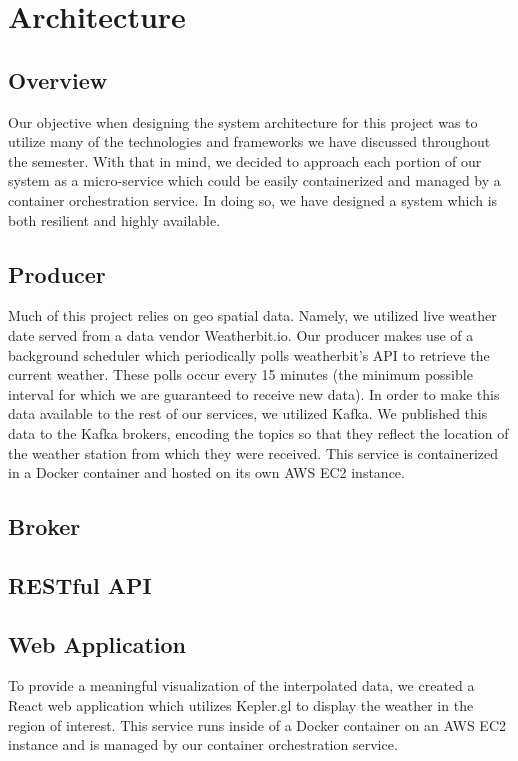 \section{Architecture}
\subsection{Overview}
Our objective when designing the system architecture for this project was to utilize many of the technologies and frameworks we have discussed throughout the semester.
With that in mind, we decided to approach each portion of our system as a micro-service which could be easily containerized and managed by a container orchestration service.
In doing so, we have designed a system which is both resilient and highly available. 

\subsection{Producer}
Much of this project relies on geo spatial data.
Namely, we utilized live weather date served from a data vendor Weatherbit.io.
Our producer makes use of a background scheduler which periodically polls weatherbit's API to retrieve the current weather.
These polls occur every 15 minutes (the minimum possible interval for which we are guaranteed to receive new data).
In order to make this data available to the rest of our services, we utilized Kafka.
We published this data to the Kafka brokers, encoding the topics so that they reflect the location of the weather station from which they were received.
This service is containerized in a Docker container and hosted on its own AWS EC2 instance.

\subsection{Broker}
\cite{kreps2011kafka}
\cite{hunt2010zookeeper}

\subsection{RESTful API}
\cite{fielding2002principled}


\subsection{Web Application}
To provide a meaningful visualization of the interpolated data, we created a React web application which utilizes Kepler.gl to display the weather in the region of interest.
This service runs inside of a Docker container on an AWS EC2 instance and is managed by our container orchestration service. 

